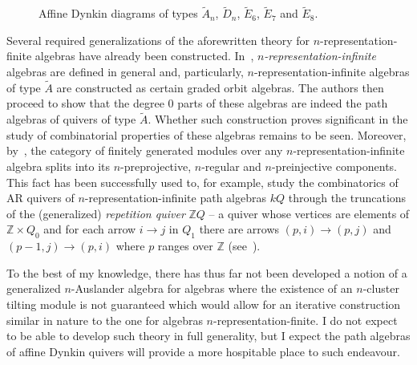 \documentclass[a4paper,oneside,svgnames]{amsart}
\theoremstyle{plain}
\theoremstyle{definition}
\newcommand{\Z}{\mathbb{Z}}
\begin{document}
\begin{figure}[ht]
\begin{subfigure}[b]{.41\textwidth}
  \end{subfigure}\linebreak
  \caption{Affine Dynkin diagrams of types $\tilde{A}_n$, $\tilde{D}_n$,
  $\tilde{E}_6$, $\tilde{E}_7$ and $\tilde{E}_8$.}
  \label{fig:affine-dynkin-diagrams}
 \end{figure}

 Several required generalizations of the aforewritten theory for
 $n$-representation-finite algebras have already been constructed.
 In~\cite{hio}, \emph{$n$-representation-infinite} algebras are defined in
 general and, particularly, $n$-representation-infinite algebras of type
 $\tilde{A}$ are constructed as certain graded orbit algebras. The authors then
 proceed to show that the degree 0 parts of these algebras are indeed the path
 algebras of quivers of type $\tilde{A}$. Whether such construction proves
 significant in the study of combinatorial properties of these algebras remains
 to be seen. Moreover, by~\cite[Theorem 4.18]{hio}, the category of finitely
 generated modules over any $n$-representation-infinite algebra splits into its
 $n$-preprojective, $n$-regular and $n$-preinjective components. This fact has
 been successfully used to, for example, study the combinatorics of AR quivers
 of $n$-representation-infinite path algebras $kQ$ through the truncations of
 the (generalized) \emph{repetition quiver} $\Z Q$ -- a quiver whose vertices
 are elements of $\Z \times Q_0$ and for each arrow $i \to j$ in $Q_1$ there are
 arrows $(p,i) \to (p,j)$ and $(p-1,j) \to (p,i)$ where $p$ ranges over $\Z$
 (see~\cite{gll}).

 To the best of my knowledge, there has thus far not been developed a notion of
 a generalized $n$-Auslander algebra for algebras where the existence of an
 $n$-cluster tilting module is not guaranteed which would allow for an iterative
 construction similar in nature to the one for algebras
 $n$-representation-finite. I do not expect to be able to develop such theory in
 full generality, but I expect the path algebras of affine Dynkin quivers will
 provide a more hospitable place to such endeavour.
\end{document}
